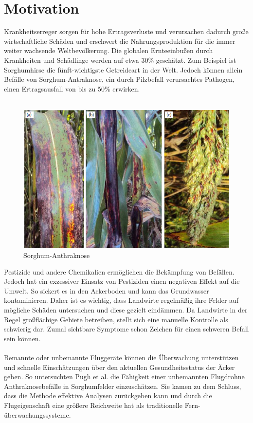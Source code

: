 \section{Motivation}

Krankheitserreger sorgen für hohe Ertragsverluste und verursachen dadurch große wirtschaftliche Schäden und erschwert die Nahrungsproduktion für die immer weiter wachsende Weltbevölkerung. Die globalen Ernteeinbußen durch Krankheiten und Schädlinge werden auf etwa 30\% geschätzt.\cite{ref:spiegel} Zum Beispiel ist Sorghumhirse die fünft-wichtigste Getreideart in der Welt. Jedoch können allein Befälle von Sorghum-Antraknose, ein durch Pilzbefall verursachtes Pathogen, einen Ertragsausfall von bis zu 50\% erwirken.\cite[S. 77]{ref:zeller}
\\\\
\begin{figure}[ht]
  \centering
  \includegraphics[width=.7\textwidth]{pics/anthracnose.PNG}
  \caption[Sorghum-Anthraknose]{Sorghum-Anthraknose\cite[S. 77]{ref:tsedaley}}
  \label{fig:anthracnose-infected}
\end{figure}
\noindent
Pestizide und andere Chemikalien ermöglichen die Bekämpfung von Befällen. Jedoch hat ein exzessiver Einsatz von Pestiziden einen negativen Effekt auf die Umwelt. So sickert es in den Ackerboden und kann das Grundwasser kontaminieren. Daher ist es wichtig, dass Landwirte regelmäßig ihre Felder auf mögliche Schäden untersuchen und diese gezielt eindämmen. Da Landwirte in der Regel großflächige Gebiete betreiben, stellt sich eine manuelle Kontrolle als schwierig dar. Zumal sichtbare Symptome schon Zeichen für einen schweren Befall sein können.
\\\\
Bemannte oder unbemannte Fluggeräte können die Überwachung unterstützen und schnelle Einschätzungen über den aktuellen Gesundheitsstatus der Äcker geben. So untersuchten Pugh et al. die Fähigkeit einer unbemannten Flugdrohne Anthraknosebefälle in Sorghumfelder einzuschätzen. Sie kamen zu dem Schluss, dass die Methode effektive Analysen zurückgeben kann und durch die Flugeigenschaft eine größere Reichweite hat als traditionelle Fern-überwachungssysteme.\cite[S. 861ff.]{ref:pug}
